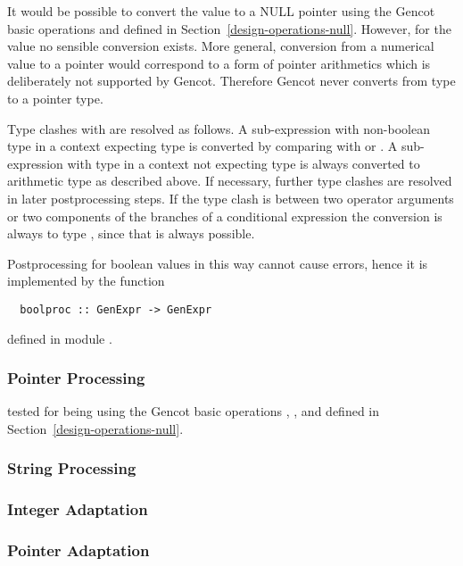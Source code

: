 It would be possible to convert the value  to a NULL pointer using the Gencot basic operations  and
 defined in Section~\ref{design-operations-null}. However, for the value  no sensible conversion exists.
More general, conversion from a numerical value to a pointer would correspond to a form of pointer arithmetics which is
deliberately not supported by Gencot. Therefore Gencot never converts from type  to a pointer type.

Type clashes with  are resolved as follows. A sub-expression with non-boolean type in a context expecting type 
is converted by comparing with  or . A sub-expression with type  in a context not expecting
type  is always converted to arithmetic type  as described above. If necessary, further type clashes are resolved
in later postprocessing steps. If the type clash is between two operator arguments
or two components of the branches of a conditional expression the conversion is always to type , since that is always
possible.

Postprocessing for boolean values in this way cannot cause errors, hence it is implemented by the function
\begin{verbatim}
  boolproc :: GenExpr -> GenExpr
\end{verbatim}
defined in module .

\subsubsection{Pointer Processing}

tested for being  using the Gencot basic operations ,
, and  defined in Section~\ref{design-operations-null}.

\subsubsection{String Processing}

\subsubsection{Integer Adaptation}

\subsubsection{Pointer Adaptation}

